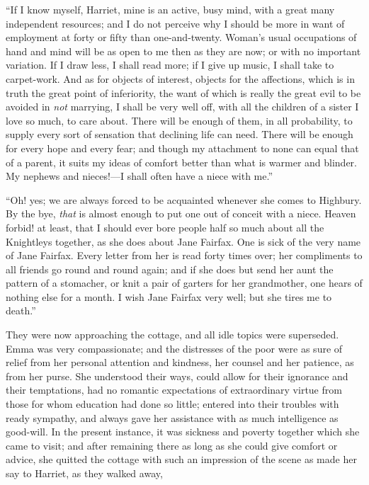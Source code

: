 
“If I know myself, Harriet, mine is an active, busy mind, with a great many independent resources; and I do not perceive why I should be more in want of employment at forty or fifty than one-and-twenty. Woman's usual occupations of hand and mind will be as open to me then as they are now; or with no important variation. If I draw less, I shall read more; if I give up music, I shall take to carpet-work. And as for objects of interest, objects for the affections, which is in truth the great point of inferiority, the want of which is really the great evil to be avoided in {\em not} marrying, I shall be very well off, with all the children of a sister I love so much, to care about. There will be enough of them, in all probability, to supply every sort of sensation that declining life can need. There will be enough for every hope and every fear; and though my attachment to none can equal that of a parent, it suits my ideas of comfort better than what is warmer and blinder. My nephews and nieces!---I shall often have a niece with me.”


“Oh! yes; we are always forced to be acquainted whenever she comes to Highbury. By the bye, {\em that} is almost enough to put one out of conceit with a niece. Heaven forbid! at least, that I should ever bore people half so much about all the Knightleys together, as she does about Jane Fairfax. One is sick of the very name of Jane Fairfax. Every letter from her is read forty times over; her compliments to all friends go round and round again; and if she does but send her aunt the pattern of a stomacher, or knit a pair of garters for her grandmother, one hears of nothing else for a month. I wish Jane Fairfax very well; but she tires me to death.”

They were now approaching the cottage, and all idle topics were superseded. Emma was very compassionate; and the distresses of the poor were as sure of relief from her personal attention and kindness, her counsel and her patience, as from her purse. She understood their ways, could allow for their ignorance and their temptations, had no romantic expectations of extraordinary virtue from those for whom education had done so little; entered into their troubles with ready sympathy, and always gave her assistance with as much intelligence as good-will. In the present instance, it was sickness and poverty together which she came to visit; and after remaining there as long as she could give comfort or advice, she quitted the cottage with such an impression of the scene as made her say to Harriet, as they walked away,


